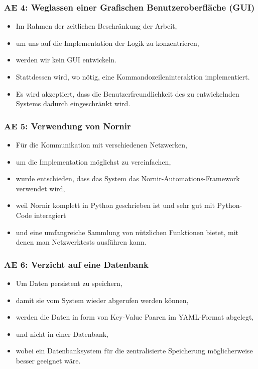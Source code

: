 \documentclass[
	ngerman,
	toc=listof, %
	toc=bibliography, %
	footnotes=multiple, %
	parskip=half, %
	numbers=noendperiod %
]{scrartcl}
\begin{document}
		\subsubsection{AE 4: Weglassen einer Grafischen Benutzeroberfläche (GUI)}
		\begin{itemize}
			\item Im Rahmen der zeitlichen Beschränkung der Arbeit,
			\item um uns auf die Implementation der Logik zu konzentrieren,
			\item werden wir kein GUI entwickeln.
			\item Stattdessen wird, wo nötig, eine Kommandozeileninteraktion implementiert.
			\item Es wird akzeptiert, dass die Benutzerfreundlichkeit des zu entwickelnden Systems dadurch eingeschränkt wird.
		\end{itemize}

		\subsubsection{AE 5: Verwendung von Nornir}
		\begin{itemize}
			\item Für die Kommunikation mit verschiedenen Netzwerken,
			\item um die Implementation möglichst zu vereinfachen,
			\item wurde entschieden, dass das System das Nornir-Automations-Framework verwendet wird,
			\item weil Nornir komplett in Python geschrieben ist und sehr gut mit Python-Code interagiert
			\item und eine umfangreiche Sammlung von nützlichen Funktionen bietet, mit denen man Netzwerktests ausführen kann.
		\end{itemize}

		\subsubsection{AE 6: Verzicht auf eine Datenbank}
		\begin{itemize}
			\item Um Daten persistent zu speichern, 
			\item damit sie vom System wieder abgerufen werden können,
			\item werden die Daten in form von Key-Value Paaren im YAML-Format abgelegt,
			\item und nicht in einer Datenbank,
			\item wobei ein Datenbanksystem für die zentralisierte Speicherung möglicherweise besser geeignet wäre.
		\end{itemize}
		\newpage
\end{document}
